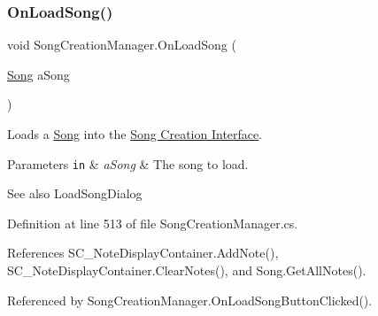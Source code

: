 \subsubsection{\texorpdfstring{On\+Load\+Song()}{OnLoadSong()}}
{\footnotesize\ttfamily void Song\+Creation\+Manager.\+On\+Load\+Song (\begin{DoxyParamCaption}\item[{\hyperlink{class_song}{Song}}]{a\+Song }\end{DoxyParamCaption})\hspace{0.3cm}{\ttfamily [private]}}



Loads a \hyperlink{class_song}{Song} into the \hyperlink{group___doc_s_c}{Song Creation Interface}. 


\begin{DoxyParams}[1]{Parameters}
\mbox{\tt in}  & {\em a\+Song} & The song to load.\\
\hline
\end{DoxyParams}
\begin{DoxySeeAlso}{See also}
Load\+Song\+Dialog 
\end{DoxySeeAlso}


Definition at line 513 of file Song\+Creation\+Manager.\+cs.



References S\+C\+\_\+\+Note\+Display\+Container.\+Add\+Note(), S\+C\+\_\+\+Note\+Display\+Container.\+Clear\+Notes(), and Song.\+Get\+All\+Notes().



Referenced by Song\+Creation\+Manager.\+On\+Load\+Song\+Button\+Clicked().



